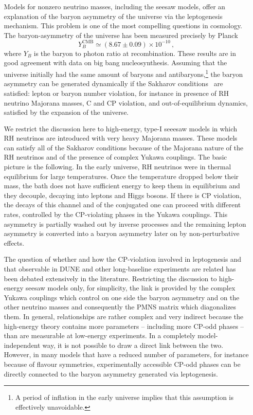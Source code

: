 Models for nonzero neutrino masses, including the seesaw models, offer an explanation of the baryon asymmetry of the universe via the leptogenesis mechanism. 
This problem is one of the most compelling questions in cosmology. The baryon-asymmetry of the universe has been measured precisely by Planck~\cite{Aghanim:2018eyx}
\begin{equation}
Y_B^{\mathrm{CMB}}\simeq (8.67\pm 0.09) \times 10^{-10}\,,
\end{equation}
where $Y_B$ is the baryon to photon ratio at recombination. These results are in good agreement with data on big bang nucleosynthesis. Assuming that the universe initially had the same amount of baryons and antibaryons,\footnote{A period of inflation in the early universe implies that this assumption is effectively unavoidable.} the baryon asymmetry can be generated dynamically if the Sakharov conditions~\cite{Sakharov:1967dj} are satisfied: lepton or baryon number violation, for instance in presence of RH neutrino Majorana masses, C and CP violation, and out-of-equilibrium dynamics, satisfied by the expansion of the universe. 

We restrict the discussion here to high-energy, type-I seeesaw models in which RH neutrinos are introduced with very heavy Majorana masses. 
These models can satisfy all of the Sakharov conditions because of the Majorana nature of the RH neutrinos and of the presence of complex Yukawa couplings. The basic picture is the following. In the early universe, RH neutrinos were in thermal equilibrium for large temperatures. Once the temperature dropped below their mass, the bath does not have sufficient energy to keep them in equilibrium and they decouple, decaying into leptons and Higgs bosons. If there is CP violation, the decays of this channel and of the conjugated one can proceed with different rates, controlled by the CP-violating phases in the Yukawa couplings. 
This asymmetry is partially washed out by inverse processes and the remaining lepton asymmetry is converted into a baryon asymmetry later on by non-perturbative  effects. 

The question of whether and how the CP-violation involved in leptogenesis and that observable
 in DUNE and other long-baseline experiments are related has been debated extensively in the
 literature. Restricting the discussion to high-energy seesaw models only, for simplicity, the link is
 provided by the complex Yukawa couplings which control on one side the baryon asymmetry and
 on the other neutrino masses and consequently the PMNS matrix which diagonalizes them. In
 general, relationships are rather complex and very indirect because the high-energy theory contains
  more parameters -- including more CP-odd phases -- than are measurable at low-energy experiments.
  In a completely model-independent way, it is not possible to draw a direct link between the two.
However, in many models that have a reduced number of parameters, for instance because of flavour symmetries,
 experimentally accessible CP-odd phases can be directly connected to the baryon asymmetry generated via leptogenesis.



